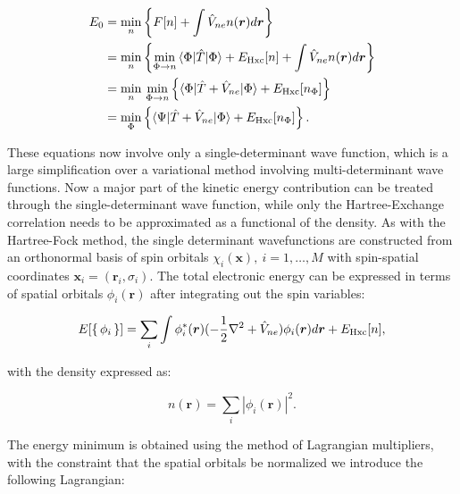 \begin{equation}
    \begin{split}
        E_0
        &= \underset{n}{\min} \left\{
            F[n] + \int \hat{V}_{ne} n(\bm{r}) d\bm{r} \right\} \\
        &= \underset{n}{\min} \left\{
            \underset{\Phi \rightarrow n}{\min}
            \braket{\Phi | \hat{T} | \Phi}
            + E_{\text{Hxc}}[n] + \int \hat{V}_{ne} n(\bm{r}) d\bm{r} \right\} \\
        &= \underset{n}{\min} \ \underset{\Phi \rightarrow n}{\min}
        \left\{ \braket{\Phi | \hat{T} + \hat{V}_{ne} | \Phi}
        + E_{\text{Hxc}}[n_{\Phi}]
        \right\} \\
        &=  \underset{\Phi}{\min}
            \left\{ \braket{\Psi|\hat{T} + \hat{V}_{ne}|\Phi}
            + E_{\text{Hxc}}[n_{\Phi}]\right\}.
    \end{split}
\end{equation}

These equations now involve only a single-determinant wave function,
which is a large simplification over a variational method involving multi-determinant
wave functions. Now a major part of the kinetic energy contribution
can be treated through the single-determinant wave function,
while only the Hartree-Exchange correlation needs to be approximated
as a functional of the density.
As with the Hartree-Fock method, the single determinant
wavefunctions are constructed from an orthonormal basis of spin orbitals
$\chi_i (\bm{x}), \ i=1,\dots,M$ with spin-spatial
coordinates $\bm{x}_i = (\bm{r}_i, \sigma_i)$.
The total electronic energy can be expressed in terms of spatial
orbitals $\phi_i(\bm{r})$ after integrating out the spin variables:

\begin{equation}
    E[\set{\phi_i}] 
    = \sum_i \int \phi_i^* (\bm{r}) (-\frac{1}{2} \nabla^2 + \hat{V}_{ne})
        \phi_i(\bm{r}) d\bm{r} + E_{\text{Hxc}}[n] ,
\end{equation}

with the density expressed as:

\begin{equation}
    n(\bm{r}) = \sum_i \left| \phi_i(\bm{r}) \right|^2 .
\end{equation}

The energy minimum is obtained using the method of Lagrangian multipliers,
with the constraint that the spatial orbitals be normalized
we introduce the following Lagrangian:

